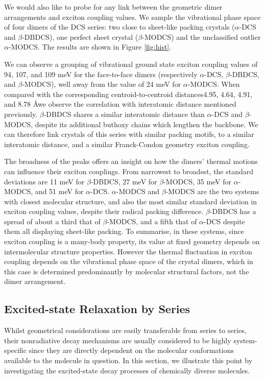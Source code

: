 We would also like to probe for any link between the geometric dimer arrangements and exciton coupling values. We sample the vibrational phase space of four dimers of the DCS series: two close to sheet-like packing crystals ($\alpha$-DCS and $\beta$-DBDCS), one perfect sheet crystal ($\beta$-MODCS) and the unclassified outlier $\alpha$-MODCS. The results are shown in Figure \ref{fig:hist}.

We can observe a grouping of vibrational ground state exciton coupling values of 94, 107, and 109 meV for the face-to-face dimers (respectively $\alpha$-DCS, $\beta$-DBDCS, and $\beta$-MODCS), well away from the value of 24 meV for $\alpha$-MODCS. When compared with the corresponding centroid-to-centroid distances\textemdash{}4.95, 4.64, 4.91, and 8.78 \AA\textemdash{}we observe the correlation with interatomic distance mentioned previously. $\beta$-DBDCS shares a similar interatomic distance than $\alpha$-DCS and $\beta$-MODCS, despite its additional buthoxy chains which lengthen the backbone. We can therefore link crystals of this series with similar packing motifs, to a similar interatomic distance, and a similar Franck-Condon geometry exciton coupling.

The broadness of the peaks offers an insight on how the dimers' thermal motions can influence their exciton couplings. From narrowest to broadest, the standard deviations are 11 meV for $\beta$-DBDCS, 27 meV for $\beta$-MODCS, 35 meV for $\alpha$-MODCS, and 51 meV for $\alpha$-DCS. $\alpha$-MODCS and $\beta$-MODCS are the two systems with closest molecular structure, and also the most similar standard deviation in exciton coupling values, despite their radical packing difference. $\beta$-DBDCS has a spread of about a third that of $\beta$-MODCS, and a fifth that of $\alpha$-DCS despite them all displaying sheet-like packing. To summarise, in these systems, since exciton coupling is a many-body property, its value at fixed geometry depends on intermolecular structure properties. However the thermal fluctuation in exciton coupling depends on the vibrational phase space of the crystal dimers, which in this case is determined predominantly by molecular structural factors, not the dimer arrangement. 

\subsection{Excited-state Relaxation by Series}
Whilst geometrical considerations are easily transferable from series to series, their nonradiative decay mechanisms are usually considered to be highly system-specific since they are directly dependent on the molecular conformations available to the molecule in question. In this section, we illustrate this point by investigating the excited-state decay processes of chemically diverse molecules.

